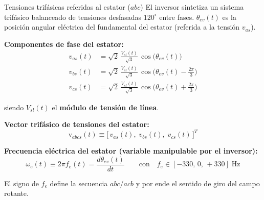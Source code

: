 \documentclass[aspectratio=169,t]{beamer}
\begin{document}
\begin{frame}{Tensiones trifásicas referidas al estator ($abc$)}
{\small\color{uncGray}El inversor sintetiza un sistema trifásico balanceado de tensiones desfasadas $120^\circ$ entre fases. $\theta_{ev}(t)$ es la posición angular eléctrica del fundamental del estator (referida a la tensión $v_{as}$).}\par
\small

\textbf{Componentes de fase del estator:}
\begin{align*}
v_{as}(t) &= \sqrt{2}\,\frac{V_{sl}(t)}{\sqrt{3}}\,\cos\!\big(\theta_{ev}(t)\big) \\
v_{bs}(t) &= \sqrt{2}\,\frac{V_{sl}(t)}{\sqrt{3}}\,\cos\!\big(\theta_{ev}(t) - \tfrac{2\pi}{3}\big) \\
v_{cs}(t) &= \sqrt{2}\,\frac{V_{sl}(t)}{\sqrt{3}}\,\cos\!\big(\theta_{ev}(t) + \tfrac{2\pi}{3}\big)
\end{align*}

siendo $V_{sl}(t)$ el \textbf{módulo de tensión de línea}.


\textbf{Vector trifásico de tensiones del estator:}
\begin{equation*}
\bm{\mathrm{v}}_{abcs}(t) \equiv \big[\,v_{as}(t),\;v_{bs}(t),\;v_{cs}(t)\,\big]^T
\end{equation*}

\textbf{Frecuencia eléctrica del estator (variable manipulable por el inversor):}
\begin{equation*}
\omega_e(t) \equiv 2\pi f_e(t) = \frac{d\theta_{ev}(t)}{dt}
\qquad\text{con}\quad f_e\in[-330,\,0,\,+330]\;\text{Hz}
\end{equation*}

{\small El signo de $f_e$ define la secuencia $abc$/$acb$ y por ende el sentido de giro del campo rotante.}
\end{frame}
\end{document}
